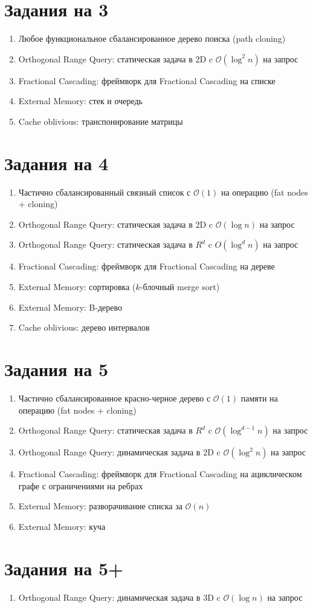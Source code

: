 \documentclass[12pt]{article}
\def\O{\mathcal{O}}
\newenvironment{MyList}{
  \begin{enumerate}
  \setlength{\parskip}{-5pt}
  \setlength{\itemsep}{5pt}
}{
  \vspace*{-1em}
  \end{enumerate}
}
\newcommand\Section[1]{\vspace*{-1em}\section{#1}}
\begin{document}
\Section{Задания на 3}
\begin{MyList}
\item Любое функциональное сбалансированное дерево поиска (path cloning)
\item Orthogonal Range Query: статическая задача в 2D c $\O(\log^2 n)$ на запрос
\item Fractional Cascading: фреймворк для Fractional Cascading на списке
\item External Memory: стек и очередь
\item Cache oblivious: транспонирование матрицы
\end{MyList}
\Section{Задания на 4}
\begin{MyList}
\item Частично сбалансированный связный список с $\O(1)$ на операцию (fat nodes + cloning)
\item Orthogonal Range Query: статическая задача в 2D c $\O(\log n)$ на запрос
\item Orthogonal Range Query: статическая задача в $R^d$ c $O(\log^d n)$ на запрос
\item Fractional Cascading: фреймворк для Fractional Cascading на дереве
\item External Memory: сортировка ($k$-блочный merge sort)
\item External Memory: B-дерево
\item Cache oblivious: дерево интервалов 
\end{MyList}
\Section{Задания на 5}
\begin{MyList}
\item Частично сбалансированное красно-черное дерево с $\O(1)$ памяти на операцию (fat nodes + cloning)
\item Orthogonal Range Query: статическая задача в $R^d$ c $\O(\log^{d-1}n)$ на запрос
\item Orthogonal Range Query: динамическая задача в 2D c $\O(\log^2 n)$ на запрос
\item Fractional Cascading: фреймворк для Fractional Cascading на ациклическом графе с ограничениями на ребрах
\item External Memory: разворачивание списка за $\O(n)$
\item External Memory: куча
\end{MyList}
\Section{Задания на 5+}
\begin{MyList}
\item Orthogonal Range Query: динамическая задача в 3D c $\O(\log n)$ на запрос
\end{MyList}
\end{document}
